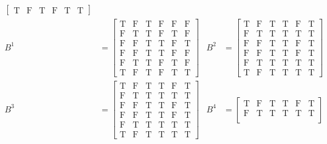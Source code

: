 \documentclass[a4paper,11pt]{article}             %
\begin{document}
\begin{ex}
\begin{exlist}
\begin{align*}
\begin{bmatrix}
\text{T} & \text{F} & \text{T} & \text{F} & \text{T} & \text{T} 
\end{bmatrix} \\
B^{1} &=
\begin{bmatrix}
\text{T} & \text{F} & \text{T} & \text{F} & \text{F} & \text{F}  \\
\text{F} & \text{T} & \text{T} & \text{F} & \text{T} & \text{F}  \\
\text{F} & \text{F} & \text{T} & \text{T} & \text{F} & \text{T}  \\
\text{F} & \text{F} & \text{T} & \text{T} & \text{F} & \text{F}  \\
\text{F} & \text{T} & \text{T} & \text{F} & \text{T} & \text{F}  \\
\text{T} & \text{F} & \text{T} & \text{F} & \text{T} & \text{T} 
\end{bmatrix}
& B^{2} &=
\begin{bmatrix}
\text{T} & \text{F} & \text{T} & \text{T} & \text{F} & \text{T}  \\
\text{F} & \text{T} & \text{T} & \text{T} & \text{T} & \text{T}  \\
\text{F} & \text{F} & \text{T} & \text{T} & \text{F} & \text{T}  \\
\text{F} & \text{F} & \text{T} & \text{T} & \text{F} & \text{T}  \\
\text{F} & \text{T} & \text{T} & \text{T} & \text{T} & \text{T}  \\
\text{T} & \text{F} & \text{T} & \text{T} & \text{T} & \text{T} 
\end{bmatrix} \\
B^{3} &=
\begin{bmatrix}
\text{T} & \text{F} & \text{T} & \text{T} & \text{F} & \text{T}  \\
\text{F} & \text{T} & \text{T} & \text{T} & \text{T} & \text{T}  \\
\text{F} & \text{F} & \text{T} & \text{T} & \text{F} & \text{T}  \\
\text{F} & \text{F} & \text{T} & \text{T} & \text{F} & \text{T}  \\
\text{F} & \text{T} & \text{T} & \text{T} & \text{T} & \text{T}  \\
\text{T} & \text{F} & \text{T} & \text{T} & \text{T} & \text{T} 
\end{bmatrix}
& B^{4} &=
\begin{bmatrix}
\text{T} & \text{F} & \text{T} & \text{T} & \text{F} & \text{T}  \\
\text{F} & \text{T} & \text{T} & \text{T} & \text{T} & \text{T}  \\

\end{bmatrix}
\end{align*}
\end{exlist}
\end{ex}
\end{document}
